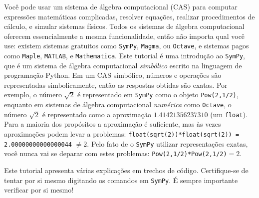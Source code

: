 Você pode usar um sistema de álgebra computacional (CAS) para computar expressões matemáticas complicadas, resolver equações, realizar procedimentos de cálculo, e simular sistemas físicos.
Todos os sistemas de álgebra computacional oferecem essencialmente a mesma funcionalidade, então não importa qual você use:
existem sistemas gratuitos como \texttt{SymPy}, \texttt{Magma}, ou \texttt{Octave}, e sistemas pagos como \texttt{Maple}, \texttt{MATLAB}, e \texttt{Mathematica}. Este tutorial é uma introdução ao \texttt{SymPy}, que é um sistema de álgebra computacional \textit{simbólico} escrito na linguagem de programação Python. Em um CAS simbólico, números e operações são representadas simbolicamente, então as respostas obtidas são exatas. Por exemplo, o número $\sqrt{2}$ é representado em \texttt{SymPy} como o objeto \texttt{Pow(2,1/2)}, enquanto em sistemas de álgebra computacional \textit{numérica} como \texttt{Octave}, o número $\sqrt{2}$ é representado como a aproximação $1.41421356237310$ (um \texttt{float}). Para a maioria dos propósitos a aproximação é suficiente, mas às vezes aproximações podem levar a problemas: \texttt{float(sqrt(2))*float(sqrt(2)) = 2.00000000000000044} $\neq 2$. Pelo fato de o \texttt{SymPy} utilizar representações exatas, você nunca vai se deparar com estes problemas: \texttt{Pow(2,1/2)*Pow(2,1/2)}$ = 2$.


Este tutorial apresenta várias explicações em trechos de código. Certifique-se de tentar por si mesmo digitando os comandos em \texttt{SymPy}. É sempre importante verificar por si mesmo!

